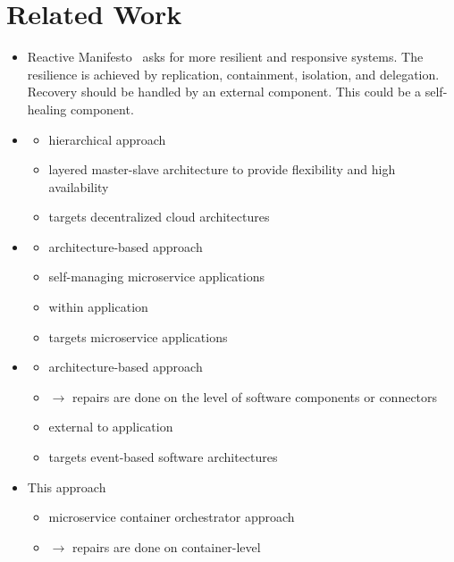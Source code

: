  
\section{Related Work}\label{sec:related-work}
  \begin{itemize}
    \item Reactive Manifesto~\cite{reactivemanifesto} asks for more resilient and responsive systems.
      The resilience is achieved by replication, containment, isolation, and delegation.
      Recovery should be handled by an external component.
      This could be a self-healing component.
    \item \cite{StackCloud}
      \begin{itemize}
        \item hierarchical approach
        \item layered master-slave architecture to provide flexibility and high availability
        \item targets decentralized cloud architectures
      \end{itemize}
    \item \cite{ToffettiMicroservices}
      \begin{itemize}
        \item architecture-based approach
        \item self-managing microservice applications
        \item within application
        \item targets microservice applications
      \end{itemize}
    \item \cite{DashofyArchitecture}
      \begin{itemize}
        \item architecture-based approach
        \item $\rightarrow$ repairs are done on the level of software components or connectors
        \item external to application
        \item targets event-based software architectures
      \end{itemize}
    \item This approach
      \begin{itemize}
        \item microservice container orchestrator approach
        \item $\rightarrow$ repairs are done on container-level

\end{itemize}
\end{itemize}
